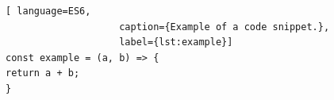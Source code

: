\documentclass[a4paper,11pt]{article}
\begin{document}
\begin{lstlisting}[ language=ES6, 
                    caption={Example of a code snippet.}, 
                    label={lst:example}]
const example = (a, b) => {
return a + b;
}
\end{lstlisting}


\newpage



\end{document}
